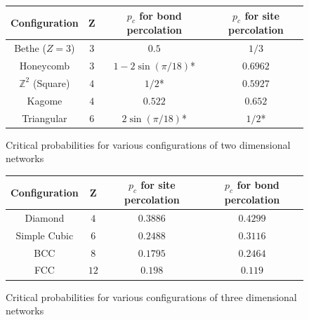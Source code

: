 \begin{figure}[h!]
\begin{center}
\begin{tabular}{| c | c | c | c |}
    \hline
    Configuration & Z & $p_c$ for bond percolation & $p_c$ for site percolation \\
    \hline
    Bethe ($Z=3$) & $3$ & $0.5$ & $1/3$ \\
    Honeycomb & $3$ & $1 - 2\sin(\pi/18)$* & $0.6962$ \\
    $\mathbb{Z}^2$ (Square) & $4$ & $1/2$* & $0.5927$ \\
    Kagome & $4$ & $0.522$ & $0.652$ \\
    Triangular & $6$ & $2\sin(\pi/18)$* & $1/2$* \\
    \hline
  \end{tabular}
\end{center}
\centering
\caption{Critical probabilities for various configurations of two dimensional networks\cite[p. 11]{Sahimi}}
\label{fig:critical probabilities in two dimensions}
\end{figure}

\begin{figure}[h!]
\begin{center}
\begin{tabular}{| c | c | c | c |}
    \hline
    Configuration & Z & $p_c$ for site percolation & $p_c$ for bond percolation \\
    \hline
    Diamond & $4$ & $0.3886$ & $0.4299$ \\
    Simple Cubic & $6$ & $0.2488$ & $0.3116$ \\
    BCC & $8$ & $0.1795$ & $0.2464$ \\
    FCC & $12$ & $0.198$ & $0.119$ \\
    \hline
  \end{tabular}
\end{center}
\centering
\caption{Critical probabilities for various configurations of three dimensional networks\cite[p. 11]{Sahimi}}
\label{fig:critical probabilities in three dimensions}
\end{figure}

